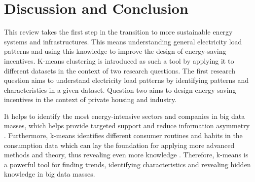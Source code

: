 


\section{Discussion and Conclusion}
\label{cha:discussionAndConclusion}

This review takes the first step in the transition to more sustainable energy systems and infrastructures.
This means understanding general electricity load patterns and using this knowledge to improve the design of energy-saving incentives.
K-means clustering is introduced as such a tool by applying it to different datasets in the context of two research questions.
The first research question aims to understand electricity load patterns by identifying patterns and characteristics in a given dataset.
Question two aims to design energy-saving incentives in the context of private housing and industry.

It helps to identify the most energy-intensive sectors and companies in big data masses, which helps provide targeted support and reduce information asymmetry \cite{LIU-BDE}.
Furthermore, k-means identifies different consumer routines and habits in the consumption data which can lay the foundation for applying more advanced methods and theory, thus revealing even more knowledge \cite{MAL-HBP}.
Therefore, k-means is a powerful tool for finding trends, identifying characteristics and revealing hidden knowledge in big data masses.

